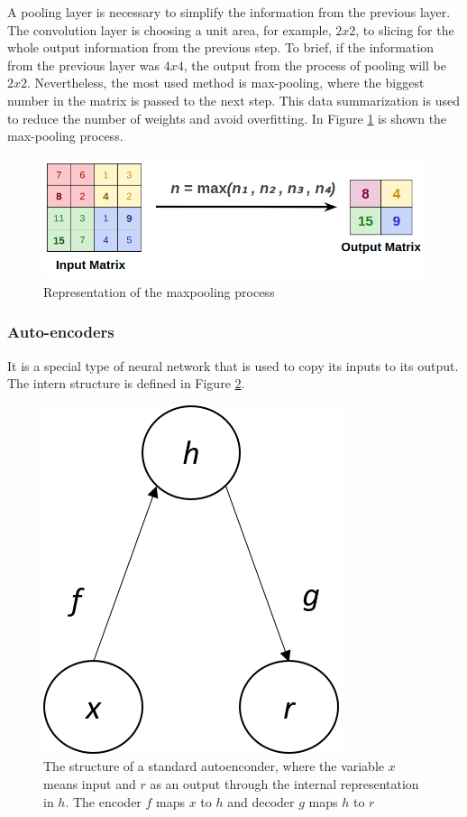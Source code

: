 A pooling layer is necessary to simplify the information from the previous layer. The convolution layer is choosing a unit area, for example, $2x2$, to slicing for the whole output information from the previous step. To brief, if the information from the previous layer was $4x4$, the output from the process of pooling will be $2x2$. Nevertheless, the most used method is max-pooling, where the biggest number in the matrix is passed to the next step. This data summarization is used to reduce the number of weights and avoid overfitting. In Figure \ref{fig:pooling} is shown the max-pooling process.

\begin{figure}[H]
\centering
\includegraphics[scale=0.35]{imagens/max_pooling.png}
\caption{Representation of the maxpooling process \cite{lecture}}
\label{fig:pooling}
\end{figure}




\subsubsection{Auto-encoders}\label{auto-encoder}

It is a special type of neural network that is used to copy its inputs to its output. The intern structure is defined in Figure \ref{fig:autoencoder}. 

\begin{figure}[H]
\centering
\includegraphics[scale=0.7]{imagens/autoencoder.png}
\caption{The structure of a standard autoenconder, where the variable $x$ means input and $r$ as an output through the internal representation in $h$. The encoder $f$ maps $x$ to $h$ and decoder $g$ maps $h$ to $r$}
\label{fig:autoencoder}
\end{figure}


